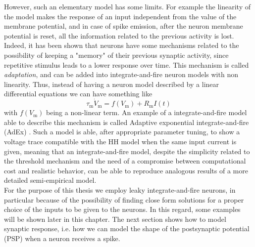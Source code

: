 \documentclass[a4paper, 12pt, twoside, openright]{book}
\begin{document}
However, such an elementary model has some limits. For example the linearity of the model makes the response of an input independent from the value of the membrane potential, and in case of spike emission, after the neuron membrane potential is reset, all the information related to the previous activity is lost.
Indeed, it has been shown that neurons have some mechanisms related to the possibility of keeping a "memory" of their previous synaptic activity, since repetitive stimulus leads to a lower response over time. This mechanism is called \textit{adaptation}, and can be added into integrate-and-fire neuron models with non linearity. Thus, instead of having a neuron model described by a linear differential equations we can have something like
\begin{equation}
    \tau_{\text{m}}\dot{V}_{\text{m}} = f(V_{\text{m}}) + R_{\text{m}} I(t)
\end{equation}
with $f(V_{\text{m}})$ being a non-linear term. An example of a integrate-and-fire model able to describe this mechanism is called Adaptive exponential integrate-and-fire (AdEx) \cite{Brette2005}. Such a model is able, after appropriate parameter tuning, to show a voltage trace compatible with the HH model when the same input current is given, meaning that an integrate-and-fire model, despite the simplicity related to the threshold mechanism and the need of a compromise between computational cost and realistic behavior, can be able to reproduce analogous results of a more detailed semi-empirical model.\\
For the purpose of this thesis we employ leaky integrate-and-fire neurons, in particular because of the possibility of finding close form solutions for a proper choice of the inputs to be given to the neurons. In this regard, some examples will be shown later in this chapter.
The next section shows how to model synaptic response, i.e. how we can model the shape of the postsynaptic potential (PSP) when a neuron receives a spike.
\end{document}

